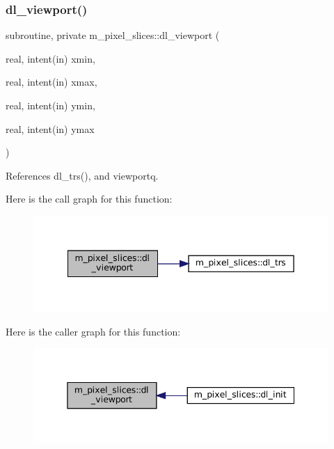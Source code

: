 \subsubsection{\texorpdfstring{dl\+\_\+viewport()}{dl\_viewport()}}
{\footnotesize\ttfamily subroutine, private m\+\_\+pixel\+\_\+slices\+::dl\+\_\+viewport (\begin{DoxyParamCaption}\item[{real, intent(in)}]{xmin,  }\item[{real, intent(in)}]{xmax,  }\item[{real, intent(in)}]{ymin,  }\item[{real, intent(in)}]{ymax }\end{DoxyParamCaption})\hspace{0.3cm}{\ttfamily [private]}}



References dl\+\_\+trs(), and viewportq.

Here is the call graph for this function\+:\nopagebreak
\begin{figure}[H]
\begin{center}
\leavevmode
\includegraphics[width=342pt]{namespacem__pixel__slices_a87a664883c6c5e0e2812df4d1ea29515_cgraph}
\end{center}
\end{figure}
Here is the caller graph for this function\+:\nopagebreak
\begin{figure}[H]
\begin{center}
\leavevmode
\includegraphics[width=345pt]{namespacem__pixel__slices_a87a664883c6c5e0e2812df4d1ea29515_icgraph}
\end{center}
\end{figure}
\mbox{\label{namespacem__pixel__slices_a61f419d67b700758eceed72e406a37f0}} 
